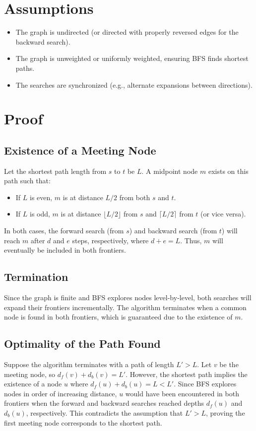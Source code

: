 \begin{appendices}
\section*{Assumptions}
\begin{itemize}
	\item The graph is undirected (or directed with properly reversed edges for the backward search).
	\item The graph is unweighted or uniformly weighted, ensuring BFS finds shortest paths.
	\item The searches are synchronized (e.g., alternate expansions between directions).
\end{itemize}

\section*{Proof}

\subsection*{Existence of a Meeting Node}
Let the shortest path length from $s$ to $t$ be $L$. A midpoint node $m$ exists on this path such that:
\begin{itemize}
	\item If $L$ is even, $m$ is at distance $L/2$ from both $s$ and $t$.
	\item If $L$ is odd, $m$ is at distance $\lfloor L/2 \rfloor$ from $s$ and $\lceil L/2 \rceil$ from $t$ (or vice versa).
\end{itemize}

In both cases, the forward search (from $s$) and backward search (from $t$) will reach $m$ after $d$ and $e$ steps, respectively, where $d + e = L$. Thus, $m$ will eventually be included in both frontiers.

\subsection*{Termination}
Since the graph is finite and BFS explores nodes level-by-level, both searches will expand their frontiers incrementally. The algorithm terminates when a common node is found in both frontiers, which is guaranteed due to the existence of $m$.

\subsection*{Optimality of the Path Found}
Suppose the algorithm terminates with a path of length $L' > L$. Let $v$ be the meeting node, so $d_f(v) + d_b(v) = L'$. However, the shortest path implies the existence of a node $u$ where $d_f(u) + d_b(u) = L < L'$. Since BFS explores nodes in order of increasing distance, $u$ would have been encountered in both frontiers when the forward and backward searches reached depths $d_f(u)$ and $d_b(u)$, respectively. This contradicts the assumption that $L' > L$, proving the first meeting node corresponds to the shortest path.


\end{appendices}
